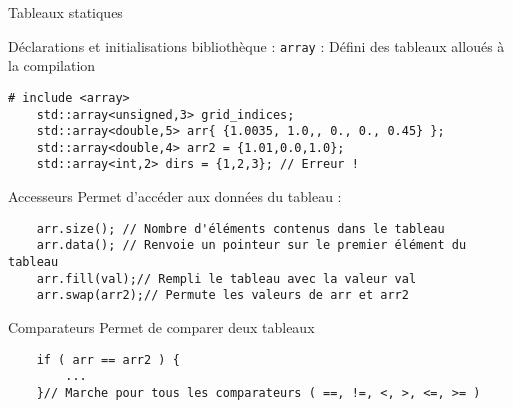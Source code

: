 \documentclass[handout,10pt]{beamer}
\begin{document}
\begin{frame}[fragile]{Tableaux statiques}
\tiny
\begin{block}{Déclarations et initialisations}
bibliothèque : \texttt{array} : Défini des tableaux alloués à la compilation
\begin{lstlisting}
# include <array>
    std::array<unsigned,3> grid_indices;
    std::array<double,5> arr{ {1.0035, 1.0,, 0., 0., 0.45} };
    std::array<double,4> arr2 = {1.01,0.0,1.0};
    std::array<int,2> dirs = {1,2,3}; // Erreur !
\end{lstlisting}
\end{block}

\begin{block}{Accesseurs}
Permet d'accéder aux données du tableau :
\begin{lstlisting}
    arr.size(); // Nombre d'éléments contenus dans le tableau
    arr.data(); // Renvoie un pointeur sur le premier élément du tableau
    arr.fill(val);// Rempli le tableau avec la valeur val
    arr.swap(arr2);// Permute les valeurs de arr et arr2
\end{lstlisting}
\end{block}

\begin{block}{Comparateurs}
Permet de comparer deux tableaux
\begin{lstlisting}
    if ( arr == arr2 ) {
        ...
    }// Marche pour tous les comparateurs ( ==, !=, <, >, <=, >= )
\end{lstlisting}
\end{block}
\end{frame}
\end{document}
